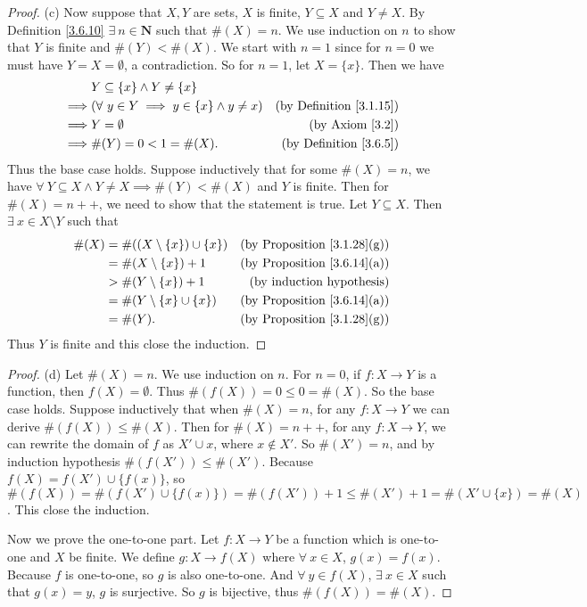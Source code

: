 \begin{proof}{(c)}
Now suppose that \(X, Y\) are sets, \(X\) is finite, \(Y \subseteq X\) and \(Y \neq X\).
By Definition \ref{3.6.10} \(\exists\ n \in \mathbf{N}\) such that \(\#(X) = n\).
We use induction on \(n\) to show that \(Y\) is finite and \(\#(Y) < \#(X)\).
We start with \(n = 1\) since for \(n = 0\) we must have \(Y = X = \emptyset\), a contradiction.
So for \(n = 1\), let \(X = \{x\}\).
Then we have
\begin{align*}
& Y \subseteq \{x\} \land Y \neq \{x\} \\
\implies & (\forall\ y \in Y \implies y \in \{x\} \land y \neq x) & \text{(by Definition \ref{3.1.15})} \\
\implies & Y = \emptyset & \text{(by Axiom \ref{3.2})} \\
\implies & \#(Y) = 0 < 1 = \#(X). & \text{(by Definition \ref{3.6.5})}
\end{align*}
Thus the base case holds.
Suppose inductively that for some \(\#(X) = n\), we have \(\forall\ Y \subseteq X \land Y \neq X \implies \#(Y) < \#(X)\) and \(Y\) is finite.
Then for \(\#(X) = n++\), we need to show that the statement is true.
Let \(Y \subseteq X\).
Then \(\exists\ x \in X \setminus Y\) such that
\begin{align*}
\#(X) &= \#((X \setminus \{x\}) \cup \{x\}) & \text{(by Proposition \ref{3.1.28}(g))} \\
&= \#(X \setminus \{x\}) + 1 & \text{(by Proposition \ref{3.6.14}(a))} \\
&> \#(Y \setminus \{x\}) + 1 & \text{(by induction hypothesis)} \\
&= \#(Y \setminus \{x\} \cup \{x\}) & \text{(by Proposition \ref{3.6.14}(a))} \\
&= \#(Y). & \text{(by Proposition \ref{3.1.28}(g))}
\end{align*}
Thus \(Y\) is finite and this close the induction.
\end{proof}

\begin{proof}{(d)}
Let \(\#(X) = n\).
We use induction on \(n\).
For \(n = 0\), if \(f : X \to Y\) is a function, then \(f(X) = \emptyset\).
Thus \(\#(f(X)) = 0 \leq 0 = \#(X)\).
So the base case holds.
Suppose inductively that when \(\#(X) = n\), for any \(f : X \to Y\) we can derive \(\#(f(X)) \leq \#(X)\).
Then for \(\#(X) = n++\), for any \(f : X \to Y\), we can rewrite the domain of \(f\) as \(X' \cup x\), where \(x \notin X'\).
So \(\#(X') = n\), and by induction hypothesis \(\#(f(X')) \leq \#(X')\).
Because \(f(X) = f(X') \cup \{f(x)\}\), so \(\#(f(X)) = \#(f(X') \cup \{f(x)\}) = \#(f(X')) + 1 \leq \#(X') + 1 = \#(X' \cup \{x\}) = \#(X)\).
This close the induction.

Now we prove the one-to-one part.
Let \(f : X \to Y\) be a function which is one-to-one and \(X\) be finite.
We define \(g : X \to f(X)\) where \(\forall\ x \in X\), \(g(x) = f(x)\).
Because \(f\) is one-to-one, so \(g\) is also one-to-one.
And \(\forall\ y \in f(X)\), \(\exists\ x \in X\) such that \(g(x) = y\), \(g\) is surjective.
So \(g\) is bijective, thus \(\#(f(X)) = \#(X)\).
\end{proof}

